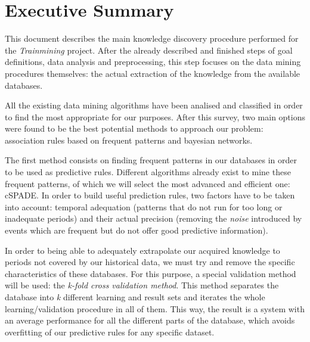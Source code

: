 \documentclass[a4paper,12pt]{article}
\begin{document}
\newcommand\litem[1]{\item{\bfseries #1 }}
\renewcommand{\arraystretch}{1.5} %

\newcommand\headcell[1]{%
  \multicolumn{1}{c|}{\cellcolor{MidnightBlue}\bfseries\sffamily\textcolor{white}{#1}}
}

%

\onehalfspacing



\section*{Executive Summary}

This document describes the main knowledge discovery procedure performed for the \emph{Trainmining} project. After the already described and finished steps of goal definitions, data analysis and preprocessing, this step focuses on the data mining procedures themselves: the actual extraction of the knowledge from the available databases.

All the existing data mining algorithms have been analised and classified in order to find the most appropriate for our purposes. After this survey, two main options were found to be the best potential methods to approach our problem: association rules based on frequent patterns and bayesian networks.

The first method consists on finding frequent patterns in our databases in order to be used as predictive rules. Different algorithms already exist to mine these frequent patterns, of which we will select the most advanced and efficient one: cSPADE. In order to build useful prediction rules, two factors have to be taken into account: temporal adequation (patterns that do not run for too long or inadequate periods) and their actual precision (removing the \emph{noise} introduced by events which are frequent but do not offer good predictive information).

In order to being able to adequately extrapolate our acquired knowledge to periods not covered by our historical data, we must try and remove the specific characteristics of these databases. For this purpose, a special validation method will be used: the \emph{k-fold cross validation method}. This method separates the database into \emph{k} different learning and result sets and iterates the whole learning/validation procedure in all of them. This way, the result is a system with an average performance for all the different parts of the database, which avoids overfitting of our predictive rules for any specific dataset.
\end{document}
